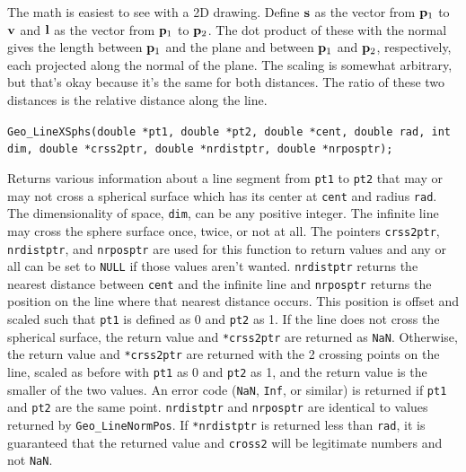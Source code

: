 \documentclass[11pt]{article}
\newcommand {\ttt} {\texttt}
\begin{document}
\begin{description}
The math is easiest to see with a 2D drawing. Define $\vb{s}$ as the vector from $\vb{p}_1$ to $\vb{v}$ and $\vb{l}$ as the vector from $\vb{p}_1$ to $\vb{p}_2$. The dot product of these with the normal gives the length between $\vb{p}_1$ and the plane and between $\vb{p}_1$ and $\vb{p}_2$, respectively, each projected along the normal of the plane. The scaling is somewhat arbitrary, but that's okay because it's the same for both distances. The ratio of these two distances is the relative distance along the line.

\item[\ttt{double}]
\ttt{Geo\_LineXSphs(double *pt1, double *pt2, double *cent, double rad, int dim, double *crss2ptr, double *nrdistptr, double *nrposptr);}

Returns various information about a line segment from \ttt{pt1} to \ttt{pt2} that may or may not cross a spherical surface which has its center at \ttt{cent} and radius \ttt{rad}. The dimensionality of space, \ttt{dim}, can be any positive integer. The infinite line may cross the sphere surface once, twice, or not at all. The pointers \ttt{crss2ptr}, \ttt{nrdistptr}, and \ttt{nrposptr} are used for this function to return values and any or all can be set to \ttt{NULL} if those values aren't wanted. \ttt{nrdistptr} returns the nearest distance between \ttt{cent} and the infinite line and \ttt{nrposptr} returns the position on the line where that nearest distance occurs. This position is offset and scaled such that \ttt{pt1} is defined as 0 and \ttt{pt2} as 1. If the line does not cross the spherical surface, the return value and \ttt{*crss2ptr} are returned as \ttt{NaN}. Otherwise, the return value and \ttt{*crss2ptr} are returned with the 2 crossing points on the line, scaled as before with \ttt{pt1} as 0 and \ttt{pt2} as 1, and the return value is the smaller of the two values. An error code (\ttt{NaN}, \ttt{Inf}, or similar) is returned if \ttt{pt1} and \ttt{pt2} are the same point. \ttt{nrdistptr} and \ttt{nrposptr} are identical to values returned by \ttt{Geo\_LineNormPos}. If \ttt{*nrdistptr} is returned less than \ttt{rad}, it is guaranteed that the returned value and \ttt{cross2} will be legitimate numbers and not \ttt{NaN}.


\end{description}
\end{document}

